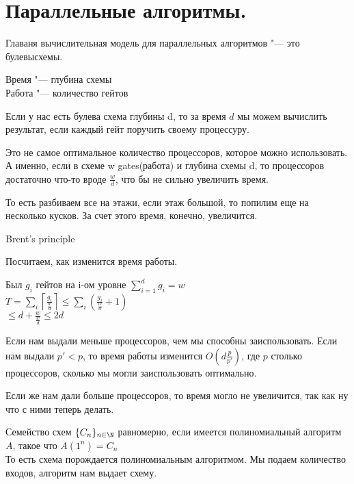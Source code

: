 ﻿\section{Параллельные алгоритмы.}
Главаня вычислительная модель для параллельных алгоритмов "--- это булевысхемы. 

\begin{Def}
Время "--- глубина схемы\\
Работа "--- количество гейтов\\
\end{Def}

Если у нас есть булева схема глубины d, то за время $d$ мы можем вычислить результат, если 
каждый гейт поручить своему процессуру. 

Это не самое оптимальное количество процессоров, которое можно использовать. А именно,
если в схеме w gates(работа) и глубина схемы d, то процессоров достаточно что-то вроде $\frac{w}{d}$, что бы 
не сильно увеличить время. 

То есть разбиваем все на этажи, если этаж большой, то попилим еще на несколько кусков. За счет этого
время, конечно, увеличится. 

\begin{theorem}
Brent's principle

Посчитаем, как изменится время работы.

Был $g_i$ гейтов на i-ом уровне $\sum_{i = 1}^{d} g_i = w$\\
$T = \sum_{i} \left \lceil \frac{g_i}{\frac{w}{d}} \right \rceil \le \sum_i (\frac{g_i}{\frac{w}{d}} + 1)$\\
$\le d + \frac{w}{\frac{w}{d}} \le 2d$\\
\end{theorem}

Если нам выдали меньше процессоров, чем мы способны заиспользовать. Если нам выдали $p' < p$, 
то время работы изменится $O(d\frac{p}{p'})$,  где $p$ столько процессоров, сколько мы могли заиспользовать
оптимально. 

Если же нам дали больше процессоров, то время могло не увеличится, так как ну что с ними теперь делать.

\begin{Def}
Семейство схем $\{C_n\}_{n \in \N}$ равномерно, если имеется полиномиальный алгоритм $A$, такое что $A(1^n) = C_n$\\

То есть схема порождается полиномиальным алгоритмом. Мы подаем количество 
входов, алгоритм нам выдает схему.
\end{Def}

